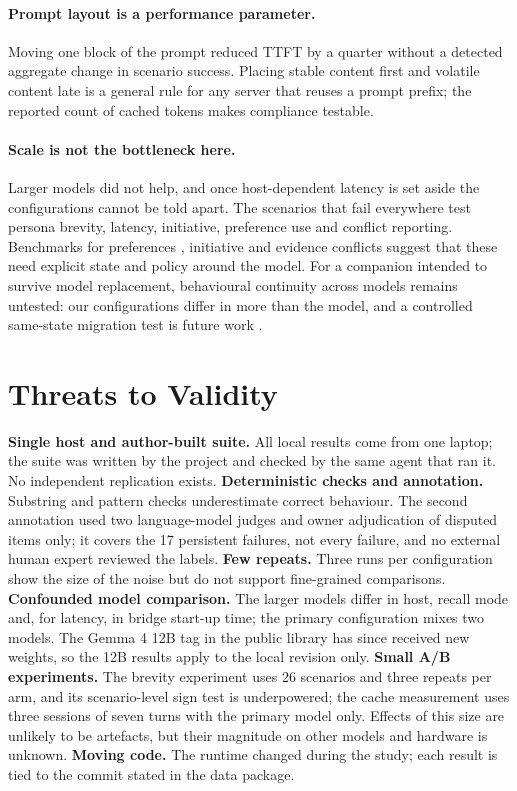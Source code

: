 \documentclass[11pt,a4paper]{article}
\begin{document}
\paragraph{Prompt layout is a performance parameter.} Moving one block of the prompt reduced TTFT by a quarter without a detected aggregate change in scenario success. Placing stable content first and volatile content late is a general rule for any server that reuses a prompt prefix; the reported count of cached tokens makes compliance testable.

\paragraph{Scale is not the bottleneck here.} Larger models did not help, and once host-dependent latency is set aside the configurations cannot be told apart. The scenarios that fail everywhere test persona brevity, latency, initiative, preference use and conflict reporting. Benchmarks for preferences \cite{prefeval,botherme,benchpres}, initiative \cite{proactive,chimein} and evidence conflicts \cite{econ,conflictweb} suggest that these need explicit state and policy around the model. For a companion intended to survive model replacement, behavioural continuity across models remains untested: our configurations differ in more than the model, and a controlled same-state migration test is future work \cite{transition,drift}.

\section{Threats to Validity}\label{sec:threats}
\textbf{Single host and author-built suite.} All local results come from one laptop; the suite was written by the project and checked by the same agent that ran it. No independent replication exists. \textbf{Deterministic checks and annotation.} Substring and pattern checks underestimate correct behaviour. The second annotation used two language-model judges and owner adjudication of disputed items only; it covers the 17 persistent failures, not every failure, and no external human expert reviewed the labels. \textbf{Few repeats.} Three runs per configuration show the size of the noise but do not support fine-grained comparisons. \textbf{Confounded model comparison.} The larger models differ in host, recall mode and, for latency, in bridge start-up time; the primary configuration mixes two models. The Gemma 4 12B tag in the public library has since received new weights, so the 12B results apply to the local revision only. \textbf{Small A/B experiments.} The brevity experiment uses 26 scenarios and three repeats per arm, and its scenario-level sign test is underpowered; the cache measurement uses three sessions of seven turns with the primary model only. Effects of this size are unlikely to be artefacts, but their magnitude on other models and hardware is unknown. \textbf{Moving code.} The runtime changed during the study; each result is tied to the commit stated in the data package.
\end{document}
